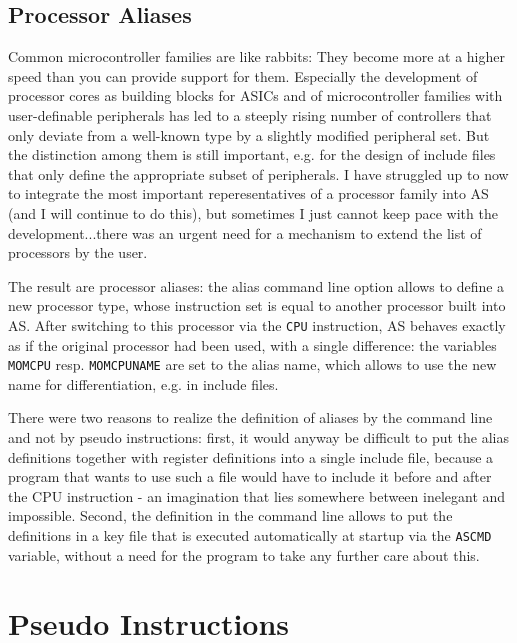 \documentclass[12pt,twoside]{report}
\newcommand{\tty}[1]{{\tt #1}}
\begin{document}
\section{Processor Aliases}
\label{SectAlias}

Common microcontroller families are like rabbits: They become more at
a higher speed than you can provide support for them.  Especially the
development of processor cores as building blocks for ASICs and of
microcontroller families with user-definable peripherals has led to a
steeply rising number of controllers that only deviate from a
well-known type by a slightly modified peripheral set.  But the
distinction among them is still important, e.g. for the design of
include files that only define the appropriate subset of peripherals. 
I have struggled up to now to integrate the most important
reperesentatives of a processor family into AS (and I will continue
to do this), but sometimes I just cannot keep pace with the
development...there was an urgent need for a mechanism to extend the
list of processors by the user.

The result are processor aliases: the alias command line option allows to
define a new processor type, whose instruction set is equal to another
processor built into AS.  After switching to this processor via the
\tty{CPU} instruction, AS behaves exactly as if the original processor had
been used, with a single difference: the variables \tty{MOMCPU} resp.
\tty{MOMCPUNAME} are set to the alias name, which allows to use the new
name for differentiation, e.g. in include files.

There were two reasons to realize the definition of aliases by the
command line and not by pseudo instructions: first, it would anyway be
difficult to put the alias definitions together with register definitions
into a single include file, because a program that wants to use such a
file would have to include it before and after the CPU instruction - an
imagination that lies somewhere between inelegant and impossible.  Second,
the definition in the command line allows to put the definitions in a key
file that is executed automatically at startup via the \tty{ASCMD}
variable, without a need for the program to take any further care about
this.


\cleardoublepage
\chapter{Pseudo Instructions}
\end{document}
